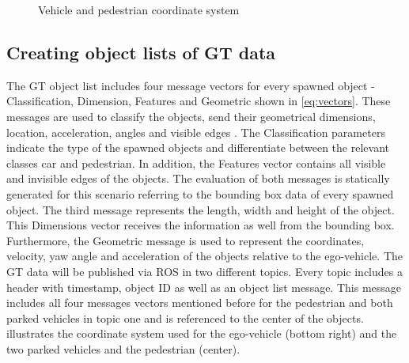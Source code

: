 \begin{figure}[b]
	\centering
	\caption{Vehicle and pedestrian coordinate system \cite{Aeberhard}}
	\label{fig:coordinate}
\end{figure}
\subsection{Creating object lists of \ac{GT} data}\label{B}
The \ac{GT} object list includes four message vectors for every spawned object - Classification, Dimension, Features and Geometric shown in \cref{eq:vectors}. These messages are used to classify the objects, send their geometrical dimensions, location, acceleration, angles and visible edges \cite{Aeberhard}.
The Classification parameters indicate the type of the spawned objects and differentiate between the relevant classes car and pedestrian. In addition, the Features vector contains all visible and invisible edges of the objects. The evaluation of both messages is statically generated for this scenario referring to the bounding box data of every spawned object. The third message represents the length, width and height of the object. This Dimensions vector receives the information as well from the bounding box. Furthermore, the Geometric message is used to represent the coordinates, velocity, yaw angle and acceleration of the objects relative to the ego-vehicle. 
The \ac{GT} data will be published via \ac{ROS} in two different topics. Every topic includes a header with timestamp, object \ac{ID} as well as an object list message. This message includes all four messages vectors mentioned before for the pedestrian and both parked vehicles in topic one and is referenced to the center of the objects.  illustrates the coordinate system used for the ego-vehicle (bottom right) and the two parked vehicles and the pedestrian (center). 

